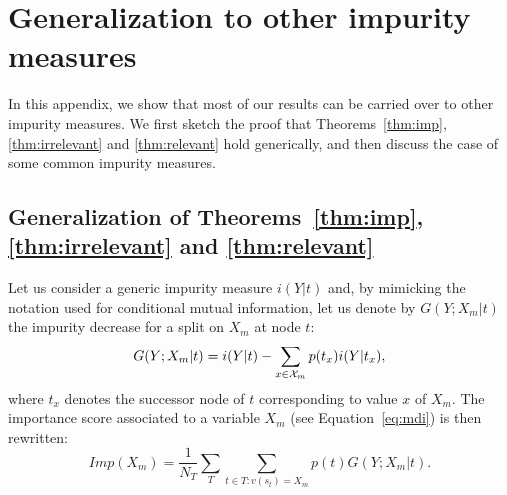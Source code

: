 \documentclass{article}
\begin{document}

\section{Generalization to other impurity measures}
\label{app:generalization}

In this appendix, we show that most of our results can be carried over
to other impurity measures. We first sketch the proof that
Theorems~\ref{thm:imp}, \ref{thm:irrelevant} and \ref{thm:relevant}
hold generically, and then discuss the case of some common impurity
measures.


\subsection{Generalization of Theorems~\ref{thm:imp}, \ref{thm:irrelevant} and \ref{thm:relevant}}

Let us consider a generic impurity measure $i(Y|t)$ and, by mimicking the
notation used for conditional mutual information, let us denote by $G(Y;X_m|t)$
the impurity decrease for a split on $X_m$ at node $t$:
\begin{equation*}%
G(Y;X_m|t) = i(Y|t)-\sum_{x\in{\cal X}_m} p(t_x) i(Y|t_x),
\end{equation*}
where $t_{x}$ denotes the successor node of $t$ corresponding to value
$x$ of $X_m$. The importance score associated to a variable $X_m$ (see
Equation~\ref{eq:mdi}) is then rewritten:
\begin{equation*}\label{eq:mdigen}
Imp(X_m) = \frac{1}{N_T} \sum_{T} \sum_{t \in T:v(s_t) = X_m} p(t) G(Y;X_m|t).
\end{equation*}
\end{document}
